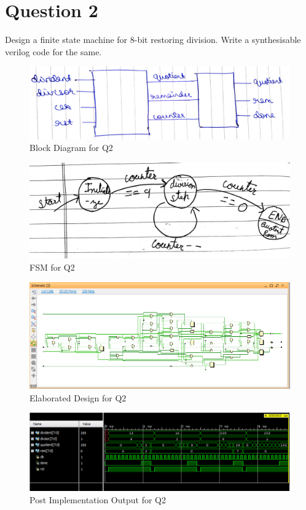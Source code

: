 \documentclass[11pt,a4paper]{article}
\begin{document}
	 \section*{Question 2}
	 Design a finite state machine for 8-bit restoring division. Write a synthesisable verilog code for the same.
	 \begin{figure}[H]
	 	\centering
	 	\includegraphics[width=1\linewidth]{images/q2blockdiag}
	 	\caption[]{Block Diagram for Q2}
	 	\label{fig:q2blck}
	 \end{figure} 
	 	\begin{figure}[H]
	 	\centering
	 	\includegraphics[scale=0.1]{images/q2fsm}
	 	\caption[]{FSM for Q2}
	 	\label{fig:q2fsm}
	 \end{figure}
	 
	 \begin{figure}[H]
	 	\centering
	 	\includegraphics[width=1\linewidth]{images/q2elaborated}
	 	\caption[]{Elaborated Design for Q2}
	 	\label{fig:q2elaborated}
	 \end{figure}
	 
	 \begin{figure}[H]
	 	\centering
	 	\includegraphics[width=1\linewidth]{images/q2output}
	 	\caption[]{Post Implementation Output for Q2}
	 	\label{fig:q2output}
	 \end{figure}
\end{document}
